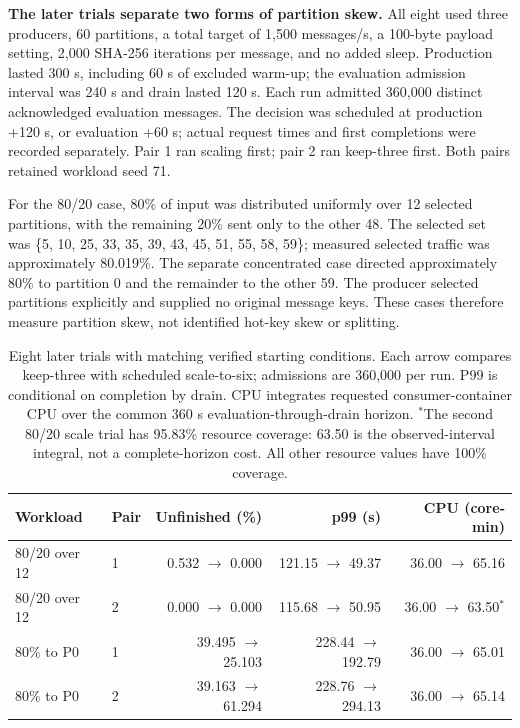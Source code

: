 \textbf{The later trials separate two forms of partition skew.} All eight used three producers, 60 partitions, a total target of 1,500 messages/s, a 100-byte payload setting, 2,000 SHA-256 iterations per message, and no added sleep. Production lasted 300 s, including 60 s of excluded warm-up; the evaluation admission interval was 240 s and drain lasted 120 s. Each run admitted 360,000 distinct acknowledged evaluation messages. The decision was scheduled at production +120 s, or evaluation +60 s; actual request times and first completions were recorded separately. Pair 1 ran scaling first; pair 2 ran keep-three first. Both pairs retained workload seed 71.

For the 80/20 case, 80\% of input was distributed uniformly over 12 selected partitions, with the remaining 20\% sent only to the other 48. The selected set was \{5, 10, 25, 33, 35, 39, 43, 45, 51, 55, 58, 59\}; measured selected traffic was approximately 80.019\%. The separate concentrated case directed approximately 80\% to partition 0 and the remainder to the other 59. The producer selected partitions explicitly and supplied no original message keys. These cases therefore measure partition skew, not identified hot-key skew or splitting.

\begin{table}[!htbp]
\centering\small
\setlength{\tabcolsep}{4pt}
\begin{tabular}{@{}llrrr@{}}
\toprule
\textbf{Workload} & \textbf{Pair} & \textbf{Unfinished (\%)} & \textbf{p99 (s)} & \textbf{CPU (core-min)}\\
\midrule
80/20 over 12 & 1 & 0.532 $\to$ 0.000 & 121.15 $\to$ 49.37 & 36.00 $\to$ 65.16\\
80/20 over 12 & 2 & 0.000 $\to$ 0.000 & 115.68 $\to$ 50.95 & 36.00 $\to$ 63.50$^{*}$\\
80\% to P0 & 1 & 39.495 $\to$ 25.103 & 228.44 $\to$ 192.79 & 36.00 $\to$ 65.01\\
80\% to P0 & 2 & 39.163 $\to$ 61.294 & 228.76 $\to$ 294.13 & 36.00 $\to$ 65.14\\
\bottomrule
\end{tabular}
\caption{Eight later trials with matching verified starting conditions. Each arrow compares keep-three with scheduled scale-to-six; admissions are 360,000 per run. P99 is conditional on completion by drain. CPU integrates requested consumer-container CPU over the common 360 s evaluation-through-drain horizon. $^{*}$The second 80/20 scale trial has 95.83\% resource coverage: 63.50 is the observed-interval integral, not a complete-horizon cost. All other resource values have 100\% coverage.}
\label{tab:preliminary-matched-skew}
\end{table}

